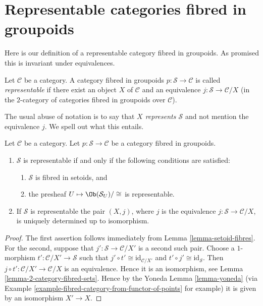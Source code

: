 \section{Representable categories fibred in groupoids}
\label{section-representable-fibred-groupoids}

\noindent
Here is our definition of a representable category fibred in groupoids.
As promised this is invariant under equivalences.

\begin{definition}
\label{definition-representable-fibred-category}
Let $\mathcal{C}$ be a category.
A category fibred in groupoids $p : \mathcal{S} \to \mathcal{C}$ is
called {\it representable} if there exist an object
$X$ of $\mathcal{C}$ and an equivalence $j : \mathcal{S} \to \mathcal{C}/X$
(in the $2$-category of categories fibred in groupoids over $\mathcal{C}$).
\end{definition}

\noindent
The usual abuse of notation is to say that {\it $X$ represents $\mathcal{S}$}
and not mention the equivalence $j$. We spell out what this entails.

\begin{lemma}
\label{lemma-characterize-representable-fibred-category}
Let $\mathcal{C}$ be a category.
Let $p : \mathcal{S} \to \mathcal{C}$ be a category fibred in groupoids.
\begin{enumerate}
\item $\mathcal{S}$ is representable if and only if
the following conditions are satisfied:
\begin{enumerate}
\item $\mathcal{S}$ is fibred in setoids, and
\item the presheaf $U \mapsto \Ob(\mathcal{S}_U)/\cong$ is
representable.
\end{enumerate}
\item If $\mathcal{S}$ is representable the pair $(X, j)$, where $j$ is the
equivalence $j : \mathcal{S} \to \mathcal{C}/X$, is uniquely determined
up to isomorphism.
\end{enumerate}
\end{lemma}

\begin{proof}
The first assertion follows immediately from
Lemma \ref{lemma-setoid-fibres}.
For the second, suppose that $j' : \mathcal{S} \to \mathcal{C}/X'$ is
a second such pair. Choose a $1$-morphism
$t' : \mathcal{C}/X' \to \mathcal{S}$ such that
$j' \circ t' \cong \text{id}_{\mathcal{C}/X'}$ and
$t' \circ j' \cong \text{id}_\mathcal{S}$. Then
$j \circ t' : \mathcal{C}/X' \to \mathcal{C}/X$ is an equivalence.
Hence it is an isomorphism, see Lemma \ref{lemma-2-category-fibred-sets}.
Hence by the Yoneda Lemma \ref{lemma-yoneda} (via
Example \ref{example-fibred-category-from-functor-of-points} for example)
it is given by an isomorphism $X' \to X$.
\end{proof}

